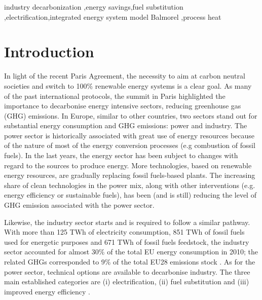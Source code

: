 \documentclass[review]{elsarticle}
\begin{document}
\begin{frontmatter}
\begin{abstract}
\end{abstract}

\begin{keyword}
industry decarbonization \sep energy savings\sep fuel substitution \sep electrification\sep integrated energy system model Balmorel \sep process heat
\end{keyword}

\end{frontmatter}

\linenumbers


\section{Introduction}

In light of the recent Paris Agreement, the necessity to aim at carbon neutral societies and switch to 100\% renewable energy systems is a clear goal. 
As many of the past international protocols, the summit in Paris highlighted the importance to decarbonise energy intensive sectors, reducing greenhouse gas (GHG) emissions. 
In Europe, similar to other countries, two sectors stand out for substantial energy consumption and GHG emissions: power and industry. 
The power sector is historically associated with great use of energy resources because of the nature of most of the energy conversion processes (e.g combustion of fossil fuels). In the last years, the energy sector has been subject to changes with regard to the sources to produce energy. More technologies, based on renewable energy resources, are gradually replacing fossil fuels-based plants. The increasing share of clean technologies in the power mix, along with other interventions (e.g. energy efficiency or sustainable fuels), has been (and is still) reducing the level of GHG emission associated with the power sector.

Likewise, the industry sector starts and is required to follow a similar pathway. 
With more than 125 TWh of electricity consumption, 851 TWh of fossil fuels used for energetic purposes and 671 TWh of fossil fuels feedstock, the industry sector accounted for almost 30\% of the total EU energy consumption in 2010; the related GHGs corresponded to 9\% of the total EU28 emissions stock \cite{Eurostat2017,Lechtenbohmer2016}.
As for the power sector, technical options are available to decarbonise industry. The three main established categories are (i) electrification, (ii) fuel substitution and (iii) improved energy efficiency \cite{Lechtenbohmer2016, Akashi2011, IRENA2014}.
\end{document}
